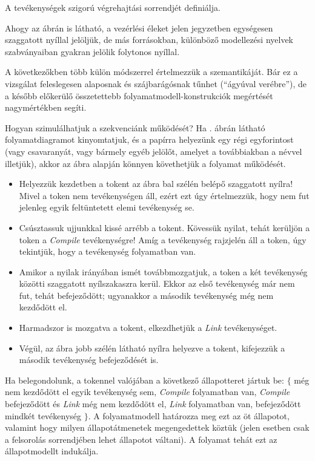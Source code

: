 \begin{definicio}
	A  tevékenységek szigorú végrehajtási sorrendjét definiálja.
\end{definicio}


\begin{megjegyzes}
Ahogy az ábrán is látható, a vezérlési éleket jelen jegyzetben egységesen szaggatott nyíllal jelöljük, de más forrásokban, különböző modellezési nyelvek szabványaiban gyakran jelölik folytonos nyíllal. 
\end{megjegyzes}


A következőkben több külön módszerrel értelmezzük a  szemantikáját. Bár ez a vizsgálat feleslegesen alaposnak és szájbarágósnak tűnhet (``ágyúval verébre''), de a később előkerülő összetettebb folyamatmodell-konstrukciók megértését nagymértékben segíti.

\begin{pelda}
Hogyan szimulálhatjuk a szekvenciánk működését? Ha . ábrán látható folyamatdiagramot kinyomtatjuk, és a papírra helyezünk egy régi egyforintost (vagy csavaranyát, vagy bármely egyéb jelölőt, amelyet a továbbiakban a  névvel illetjük), akkor az ábra alapján könnyen követhetjük a folyamat működését. \begin{itemize}
  \item Helyezzük kezdetben a tokent az ábra bal szélén belépő szaggatott nyílra! Mivel a token nem tevékenységen áll, ezért ezt úgy értelmezzük, hogy nem fut jelenleg egyik feltüntetett elemi tevékenység se.
  \item Csúsztassuk ujjunkkal kissé arrébb a tokent. Kövessük nyilat, tehát kerüljön a token a \emph{Compile} tevékenységre! Amíg a tevékenység rajzjelén áll a token, úgy tekintjük, hogy a tevékenység folyamatban van.
  \item Amikor a nyilak irányában ismét továbbmozgatjuk, a token a két tevékenység közötti szaggatott nyílszakaszra kerül. Ekkor az első tevékenység már nem fut, tehát befejeződött; ugyanakkor a második tevékenység még nem kezdődött el.
  \item Harmadszor is mozgatva a tokent, elkezdhetjük a \emph{Link} tevékenységet.
  \item Végül, az ábra jobb szélén látható nyílra helyezve a tokent, kifejezzük a második tevékenység befejeződését is.
\end{itemize}
Ha belegondolunk, a tokennel valójában  a következő állapotteret jártuk be: $\{$ még nem kezdődött el egyik tevékenység sem, \emph{Compile} folyamatban van, \emph{Compile} befejeződött és \emph{Link} még nem kezdődött el, \emph{Link} folyamatban van, befejeződött mindkét tevékenység $\}$. A folyamatmodell határozza meg ezt az öt állapotot, valamint hogy milyen állapotátmenetek megengedettek köztük (jelen esetben csak a felsorolás sorrendjében lehet állapotot váltani). A folyamat tehát ezt az állapotmodellt indukálja.
\end{pelda}

